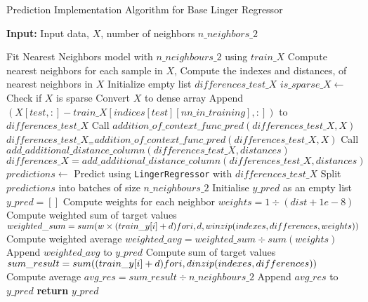 \documentclass[a4paper, 12pt]{report}
\begin{document}
\begin{algorithm}[H]
    \caption{Prediction Implementation Algorithm for Base Linger Regressor}
    \textbf{Input:} Input data, $X$, number of neighbors $n\_neighbors\_2$
    \label{alg:base_linger_regressor_predict}
    \begin{algorithmic}[1]
            \State Fit Nearest Neighbors model with $n\_neighbours\_2$ using $train\_X$
            \State Compute nearest neighbors for each sample in $X$, 
            \State Compute the indexes and distances, of nearest neighbors in $X$
            \State Initialize empty list $differences\_test\_X$
            \State $is\_sparse\_X \gets$ Check if $X$ is sparse
                \State Convert $X$ to dense array
            \EndIf
                    \State Append $(X[test, :] - train\_X[indices[test][nn\_in\_training], :])$ to $differences\_test\_X$
                \EndFor
            \EndFor
                \State Call $addition\_of\_context\_func\_pred(differences\_test\_X, X)$
                \State $differences\_test\_X_= addition\_of\_context\_func\_pred(differences\_test\_X, X)$
                \State Call $add\_additional\_distance\_column(differences\_test\_X, distances)$
                \State $differences\_X = add\_additional\_distance\_column(differences\_test\_X, distances)$
            \EndIf
            \State $predictions \gets$ Predict using \texttt{LingerRegressor} with $differences\_test\_X$
            \State Split $predictions$ into batches of size $n\_neighbours\_2$
            \State Initialise $y\_pred$ as an empty list 
            \State $y\_pred = []$
                    \State Compute weights for each neighbor
                    \State $weights = 1 \div (dist + 1e-8)$
                    \State Compute weighted sum of target values
                    \State $weighted\_sum = sum(w \times (train\_y[i] + d) for \space i, d, w \space \space in \space zip(indexes, differences, weights))$ 
                    \State Compute weighted average
                    \State $weighted\_avg = weighted\_sum \div sum(weights)$
                    \State Append $weighted\_avg$ to $y\_pred$
                \EndFor
            \Else
                    \State Compute sum of target values
                    \State $sum\_result =  sum((train\_y[i] + d) for \space i, d \space \space in \space zip(indexes, differences))$ 
                    \State Compute average
                    \State $avg\_res = sum\_result \div n\_neighbours\_2$
                    \State Append $avg\_res$ to $y\_pred$
                \EndFor
            \EndIf
            \State \textbf{return} $y\_pred$
        \EndFunction
    \end{algorithmic}
\end{algorithm}
\end{document}
